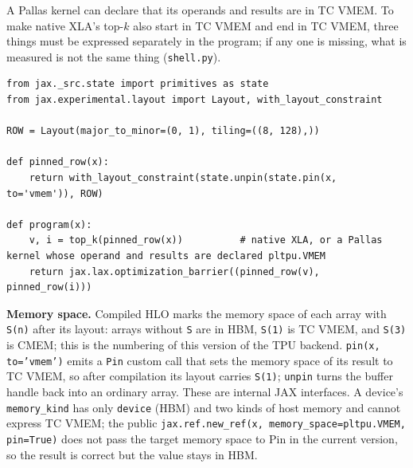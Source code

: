 \documentclass[sigconf,nonacm,balance=false]{acmart}
\newcommand{\code}[1]{\texttt{#1}}
\begin{document}
A Pallas kernel can declare that its operands and results are in TC VMEM. To make native XLA's top-$k$ also start in TC VMEM and end in TC VMEM, three things must be expressed separately in the program; if any one is missing, what is measured is not the same thing (\code{shell.\allowbreak{}py}).

\begin{lstlisting}
from jax._src.state import primitives as state
from jax.experimental.layout import Layout, with_layout_constraint

ROW = Layout(major_to_minor=(0, 1), tiling=((8, 128),))

def pinned_row(x):
    return with_layout_constraint(state.unpin(state.pin(x, to='vmem')), ROW)

def program(x):
    v, i = top_k(pinned_row(x))          # native XLA, or a Pallas kernel whose operand and results are declared pltpu.VMEM
    return jax.lax.optimization_barrier((pinned_row(v), pinned_row(i)))
\end{lstlisting}
\textbf{Memory space.} Compiled HLO marks the memory space of each array with \code{S(\allowbreak{}n)} after its layout: arrays without \code{S} are in HBM, \code{S(\allowbreak{}1)} is TC VMEM, and \code{S(\allowbreak{}3)} is CMEM; this is the numbering of this version of the TPU backend. \code{pin(\allowbreak{}x,\allowbreak{} to=\allowbreak{}'vmem')} emits a \code{Pin} custom call that sets the memory space of its result to TC VMEM, so after compilation its layout carries \code{S(\allowbreak{}1)}; \code{unpin} turns the buffer handle back into an ordinary array. These are internal JAX interfaces. A device's \code{memory\_\allowbreak{}kind} has only \code{device} (HBM) and two kinds of host memory and cannot express TC VMEM; the public \code{jax.\allowbreak{}ref.\allowbreak{}new\_\allowbreak{}ref(\allowbreak{}x,\allowbreak{} memory\_\allowbreak{}space=\allowbreak{}pltpu.\allowbreak{}VMEM,\allowbreak{} pin=\allowbreak{}True)} does not pass the target memory space to Pin in the current version, so the result is correct but the value stays in HBM.
\end{document}
